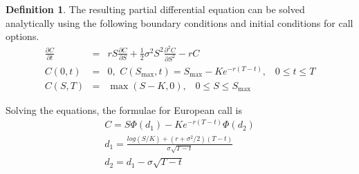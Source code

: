 \documentclass[12pt, oneside]{book}
\theoremstyle{plain}
\theoremstyle{definition}
\newtheorem{definition}[theorem]{Definition}
\begin{document}
\begin{definition}\label{bsAnal} The resulting partial differential equation can be solved analytically using the following boundary conditions and initial conditions for call options.
\begin{eqnarray}
\frac{\partial C}{\partial t} &=& rS\frac{\partial C}{\partial S}+\frac{1}{2} \sigma^2 S^2 \frac{\partial^2 C}{\partial S^2} - rC \\[10pt]
C(0,t) &=& 0, \hspace{4pt} C(S_{\max},t)=S_{\max} - K e^{-r(T-t)}, \hspace{10pt} 0 \leq t \leq T \\[10pt]
C(S,T) &=& \max(S-K,0), \hspace{10pt} 0 \leq S \leq S_{\max}
\end{eqnarray}

Solving the equations, the formulae \cite{wilmott} for European call is
\begin{eqnarray}
C = S \Phi (d_1) - K e^{-r(T-t)} \Phi (d_2) \\[10pt]
d_1 = \frac{log(S/K) + (r + \sigma^2/2)(T - t)}{\sigma \sqrt{T-t}} \\[10pt]
d_2 = d_1 - \sigma \sqrt{T-t}
\end{eqnarray}

\end{definition}
\end{document}
